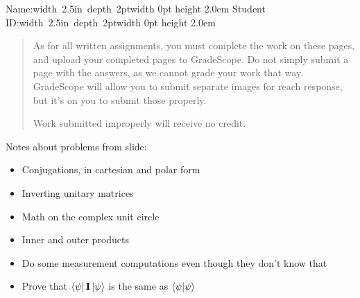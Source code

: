 \documentclass[12pt]{article}
\newcommand{\NameBlank}{\mbox{\hskip 4pt\vrule width 2.5in depth 2pt}\vrule width 0pt height 2.0em}
\begin{document}

\noindent Name:\NameBlank{}   Student ID:\NameBlank{} \newline

\begin{quote}
    As for all written assignments, you must complete the work on these pages, and upload your completed pages to GradeScope.  Do not simply submit a page with the answers, as we cannot grade your work that way.  GradeScope will allow you to submit separate images for reach response, but it's on you to submit those properly.

    Work submitted improperly will receive no credit.
\end{quote}

Notes about problems from slide:
\begin{itemize}
    \item Conjugations, in cartesian and polar form
    \item Inverting unitary matrices
    \item Math on the complex unit circle
    \item Inner and outer products
    \item Do some measurement computations even though they don't know that
    \item Prove that $\bra{\psi}\mathbf{I}\ket{\psi}$ is the same as $\braket{\psi|\psi}$
\end{itemize}
\end{document}
